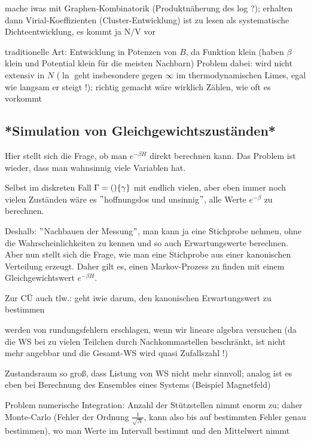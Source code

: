 \documentclass[../KlassMech_main.tex]{subfiles}
\begin{document}
mache iwas mit Graphen-Kombinatorik (Produktnäherung des log ?); erhalten dann Virial-Koeffizienten (Cluster-Entwicklung)
ist zu lesen als systematische Dichteentwicklung, es kommt ja N/V vor


traditionelle Art: Entwicklung in Potenzen von $B$, da Funktion klein (haben $\beta$ klein und Potential klein für die meisten Nachbarn)
Problem dabei: wird nicht extensiv in $N$ ($\ln$ geht insbesondere gegen $\infty$ im thermodynamischen Limes, egal wie langsam er steigt !); richtig gemacht wäre wirklich Zählen, wie oft es vorkommt



	\subsection{*Simulation von Gleichgewichtszuständen*}
Hier stellt sich die Frage, ob man $e^{-\beta H}$ direkt berechnen kann. Das Problem ist wieder, dass man wahnsinnig viele Variablen hat.

Selbst im diskreten Fall $\Gamma = \qty\{\gamma\}$ mit endlich vielen, aber eben immer noch vielen Zuständen wäre es $"$hoffnungslos und unsinnig$"$, alle Werte $e^{-\beta}$ zu berechnen.

Deshalb: $"$Nachbauen der Messung$"$, man kann ja eine Stichprobe nehmen, ohne die Wahrscheinlichkeiten zu kennen und so auch Erwartungswerte berechnen. Aber nun stellt sich die Frage, wie man eine Stichprobe aus einer kanonischen Verteilung erzeugt. Daher gilt es, einen Markov-Prozess zu finden mit einem Gleichgewichtswert $e^{-\beta H}$.


Zur CÜ auch tlw.:
geht iwie darum, den kanonischen Erwartungswert zu bestimmen

werden von rundungsfehlern erschlagen, wenn wir lineare algebra versuchen (da die WS bei zu vielen Teilchen durch Nachkommastellen beschränkt, ist nicht mehr angebbar und die Gesamt-WS wird quasi Zufallszahl !)

Zustandsraum so groß, dass Listung von WS nicht mehr sinnvoll; analog ist es eben bei Berechnung des Ensembles eines Systems (Beispiel Magnetfeld)


Problem numerische Integration: Anzahl der Stützstellen nimmt enorm zu; daher Monte-Carlo (Fehler der Ordnung $\frac{1}{\sqrt{N}}$, kann also bis auf bestimmten Fehler genau bestimmen), wo man Werte im Intervall bestimmt und den Mittelwert nimmt
\end{document}
